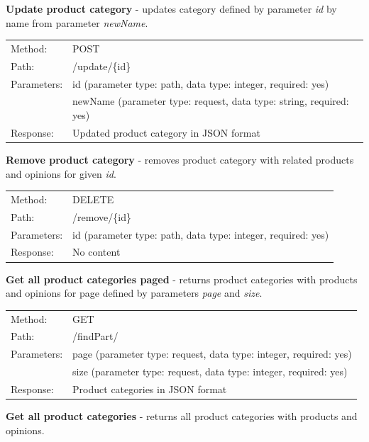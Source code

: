 \documentclass[10pt,a4paper]{article}
\begin{document}
\noindent\textbf{Update product category} - updates category defined by parameter \textit{id} by name from parameter \textit{newName}. 

{\renewcommand{\arraystretch}{1}
  \begin{tabular}{ll}
  Method: & POST \\
  Path: & /update/\{id\} \\
  Parameters: & id (parameter type: path, data type: integer, required: yes)\\
              & newName (parameter type: request, data type: string, required: yes)\\
  Response: & Updated product category in JSON format  \\
  \end{tabular} \vspace{5mm}
}

\noindent\textbf{Remove product category} - removes product category with related products and opinions for given \textit{id}.

{\renewcommand{\arraystretch}{1}
  \begin{tabular}{ll}
  Method: & DELETE \\
  Path: & /remove/\{id\} \\
  Parameters: & id (parameter type: path, data type: integer, required: yes)\\
  Response: & No content  \\
  \end{tabular} \vspace{5mm}
}

\noindent\textbf{Get all product categories paged} - returns product categories with products and opinions for page defined by parameters \textit{page} and \textit{size}.

{\renewcommand{\arraystretch}{1}
  \begin{tabular}{ll}
  Method: & GET \\
  Path: & /findPart/ \\
  Parameters: & page (parameter type: request, data type: integer, required: yes)\\
              & size (parameter type: request, data type: integer, required: yes)\\
  Response: & Product categories in JSON format  \\
  \end{tabular} \vspace{5mm}
  }
  
\noindent\textbf{Get all product categories} - returns all product categories with products and opinions.
\end{document}

